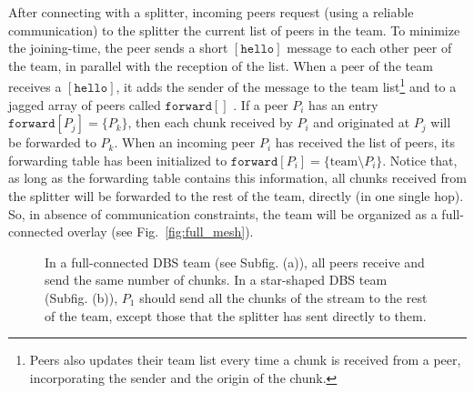 

\label{sec:joining}

After connecting with a splitter, incoming peers request (using a
reliable communication) to the splitter the current list of peers in
the team. To minimize the \gls{joining-time}, the peer sends a short
$[\mathtt{hello}]$ message to each other peer of the team, in parallel
with the reception of the list. When a peer of the team receives a
$[\mathtt{hello}]$, it adds the sender of the message to the team
list\footnote{Peers also updates their team list every time a chunk is
  received from a peer, incorporating the sender and the origin of the
  chunk.} and to a jagged array of peers called $\mathtt{forward}[]$
. If a peer $P_i$ has an entry
$\mathtt{forward}[P_j]=\{P_k\}$, then each chunk received by $P_i$ and
originated at $P_j$ will be forwarded to $P_k$. When an incoming peer
$P_i$ has received the list of peers, its forwarding table has been
initialized to $\mathtt{forward}[P_i]=\{\text{team}\setminus
P_i\}$. Notice that, as long as the forwarding table contains this
information, all chunks received from the splitter will be forwarded
to the rest of the team, directly (in one single hop). So, in absence
of communication constraints, the team will be organized as a
full-connected overlay (see Fig.~\ref{fig:full_mesh}).
%
\begin{figure*}[h!]
  \centering
  \caption{In a full-connected DBS team (see Subfig. (a)), all peers
    receive and send the same number of chunks. In a star-shaped DBS
    team (Subfig. (b)), $P_1$ should send all the chunks of the stream
    to the rest of the team, except those that the splitter has sent
    directly to them.}
\end{figure*}
%


